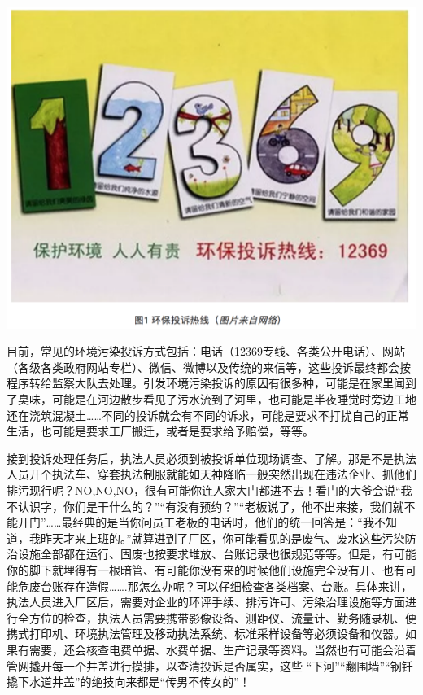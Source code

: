 \documentclass[]{book}
\begin{document}
\includegraphics[width=8.33in]{images/hjzf1}

目前，常见的环境污染投诉方式包括：电话（12369专线、各类公开电话）、网站（各级各类政府网站专栏）、微信、微博以及传统的来信等，这些投诉最终都会按程序转给监察大队去处理。引发环境污染投诉的原因有很多种，可能是在家里闻到了臭味，可能是在河边散步看见了污水流到了河里，也可能是半夜睡觉时旁边工地还在浇筑混凝土\ldots{}\ldots{}不同的投诉就会有不同的诉求，可能是要求不打扰自己的正常生活，也可能是要求工厂搬迁，或者是要求给予赔偿，等等。

接到投诉处理任务后，执法人员必须到被投诉单位现场调查、了解。那是不是执法人员开个执法车、穿套执法制服就能如天神降临一般突然出现在违法企业、抓他们排污现行呢？NO,NO,NO，很有可能你连人家大门都进不去！看门的大爷会说``我不认识字，你们是干什么的？''``有没有预约？''``老板说了，他不出来接，我们就不能开门''\ldots{}\ldots{}最经典的是当你问员工老板的电话时，他们的统一回答是：``我不知道，我昨天才来上班的。''就算进到了厂区，你可能看见的是废气、废水这些污染防治设施全部都在运行、固废也按要求堆放、台账记录也很规范等等。但是，有可能你的脚下就埋得有一根暗管、有可能你没有来的时候他们设施完全没有开、也有可能危废台账存在造假\ldots{}\ldots{}.那怎么办呢？可以仔细检查各类档案、台账。具体来讲，执法人员进入厂区后，需要对企业的环评手续、排污许可、污染治理设施等方面进行全方位的检查，执法人员需要携带影像设备、测距仪、流量计、勤务随录机、便携式打印机、环境执法管理及移动执法系统、标准采样设备等必须设备和仪器。如果有需要，还会核查电费单据、水费单据、生产记录等资料。当然也有可能会沿着管网撬开每一个井盖进行摸排，以查清投诉是否属实，这些
``下河''``翻围墙''``钢钎撬下水道井盖''的绝技向来都是``传男不传女的''！
\end{document}
